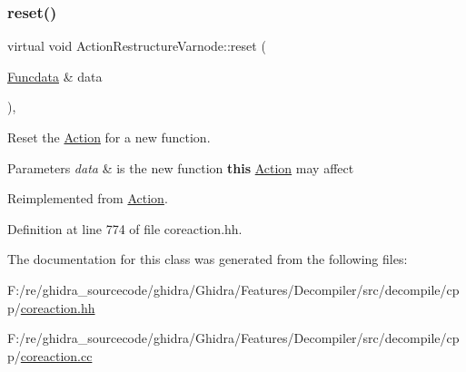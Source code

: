 \subsubsection{\texorpdfstring{reset()}{reset()}}
{\footnotesize\ttfamily virtual void Action\+Restructure\+Varnode\+::reset (\begin{DoxyParamCaption}\item[{\mbox{\hyperlink{class_funcdata}{Funcdata}} \&}]{data }\end{DoxyParamCaption})\hspace{0.3cm}{\ttfamily [inline]}, {\ttfamily [virtual]}}



Reset the \mbox{\hyperlink{class_action}{Action}} for a new function. 


\begin{DoxyParams}{Parameters}
{\em data} & is the new function {\bfseries{this}} \mbox{\hyperlink{class_action}{Action}} may affect \\
\hline
\end{DoxyParams}


Reimplemented from \mbox{\hyperlink{class_action_ac7c1cf16bb63e0741ba16be5179cf943}{Action}}.



Definition at line 774 of file coreaction.\+hh.



The documentation for this class was generated from the following files\+:\begin{DoxyCompactItemize}
\item 
F\+:/re/ghidra\+\_\+sourcecode/ghidra/\+Ghidra/\+Features/\+Decompiler/src/decompile/cpp/\mbox{\hyperlink{coreaction_8hh}{coreaction.\+hh}}\item 
F\+:/re/ghidra\+\_\+sourcecode/ghidra/\+Ghidra/\+Features/\+Decompiler/src/decompile/cpp/\mbox{\hyperlink{coreaction_8cc}{coreaction.\+cc}}\end{DoxyCompactItemize}
